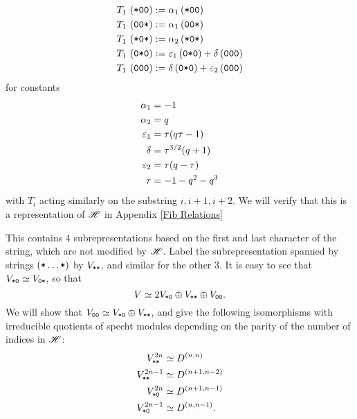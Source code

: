 \documentclass{amsart}
\begin{document}
  \begin{equation} 
    \begin{split}
      T_1 \, \left( \texttt{*}\texttt{0}\texttt{0} \right) &:= \alpha_1\left( \texttt{*}\texttt{0}\texttt{0} \right)\\
      T_1 \, \left( \texttt{0}\texttt{0}\texttt{*} \right) &:= \alpha_1\left( \texttt{0}\texttt{0}\texttt{*} \right)\\
      T_1 \, \left( \texttt{*}\texttt{0}\texttt{*} \right) &:= \alpha_2\left( \texttt{*}\texttt{0}\texttt{*} \right)\\
      T_1 \, \left( \texttt{0}\texttt{*}\texttt{0} \right) &:= \varepsilon_1\left( \texttt{0}\texttt{*}\texttt{0} \right) + \delta\left( \texttt{0}\texttt{0}\texttt{0} \right)\\
      T_1 \, \left( \texttt{0}\texttt{0}\texttt{0} \right) &:= \delta\left( \texttt{0}\texttt{*}\texttt{0} \right) + \varepsilon_2\left( \texttt{0}\texttt{0}\texttt{0} \right)
  \end{split} \label{Fib Action} 
  \end{equation}
  for constants
  \begin{equation}
    \begin{split}
    \alpha_1 &= -1\\
    \alpha_2 &= q\\
    \varepsilon_1 &= \tau(q\tau - 1)\\
    \delta &= \tau^{3/2}(q + 1)\\
    \varepsilon_2 &= \tau(q-\tau)\\
    \tau &= -1-q^2-q^3
  \end{split} \label{Fib Constants} 
  \end{equation}
  with $T_i$ acting similarly on the substring $i,i+1,i+2$.
  We will verify that this is a representation of $\mathscr{H}$ in Appendix \ref{Fib Relations}

  This contains 4 subrepresentations based on the first and last character of the string, which are not modified by $\mathscr{H}$.
  Label the subrepresentation spanned by strings $(\texttt{*}\dots\texttt{*})$ by $V_{\texttt{*}\texttt{*}}$, and similar for the other 3.
  It is easy to see that $V_{\texttt{*}\texttt{0}} \simeq V_{\texttt{0}\texttt{*}}$, so that
  \[
    V \simeq 2V_{\texttt{*}\texttt{0}} \oplus V_{\texttt{*}\texttt{*}} \oplus V_{\texttt{0}\texttt{0}}.
  \]
  We will show that $V_{\texttt{0}\texttt{0}} \simeq V_{\texttt{*}\texttt{0}} \oplus V_{\texttt{*}\texttt{*}}$, and give the following isomorphisms with irreducible quotients of specht modules depending on the parity of the number of indices in $\mathscr{H}$:
  \begin{equation}
    \begin{split}    
      V^{2n}_{\texttt{*}\texttt{*}} &\simeq D^{(n,n)}\\ 
      V^{2n-1}_{\texttt{*}\texttt{*}} &\simeq D^{(n+1,n-2)}\\
      V^{2n}_{\texttt{*}\texttt{0}} &\simeq D^{(n+1,n-1)}\\
      V^{2n-1}_{\texttt{*}\texttt{0}} &\simeq D^{(n,n-1)}.
    \end{split} \label{Fib Isos}
  \end{equation}
\end{document}
